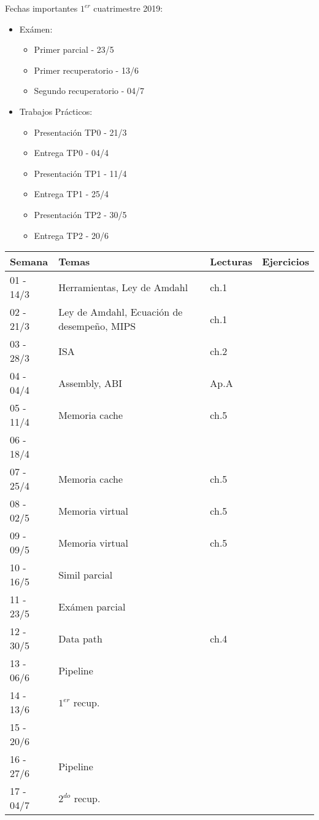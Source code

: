 \documentclass[9pt,a4paper]{article}
\begin{document}
Fechas importantes $1^{er}$ cuatrimestre 2019:

\begin{itemize}
\item Exámen:
\begin{itemize}
\item Primer parcial - 23/5
\item Primer recuperatorio - 13/6
\item Segundo recuperatorio - 04/7
\end{itemize}
\item Trabajos Prácticos:
\begin{itemize}
\item Presentación TP0 - 21/3
\item Entrega TP0 - 04/4
\item Presentación TP1 - 11/4
\item Entrega TP1 - 25/4
\item Presentación TP2 - 30/5
\item Entrega TP2 - 20/6
\end{itemize}

\end{itemize}

\begin{tabular}{ |l | l | l | l |}
\hline
Semana & Temas			& Lecturas     & Ejercicios						\\
\hline
01 - 14/3	& Herramientas, Ley de Amdahl 		& ch.1 \cite{caaqa}	&			\\
\hline
02 - 21/3	& Ley de Amdahl, Ecuación de desempeño, MIPS & ch.1 \cite{caaqa}    &	\\
\hline
03 - 28/3	& ISA					&		ch.2 \cite{caaqa}	&					\\
\hline
04 - 04/4	& Assembly, ABI 	& 		Ap.A \cite{caaqa} \cite{abi} &	\\
\hline
05 - 11/4	& Memoria cache	& 	ch.5 \cite{caaqa}	&	\\
\hline
\rowcolor{lightgray} 06 - 18/4	& 	& 		&		\\
\hline
07 - 25/4	& Memoria cache	& 		ch.5 \cite{caaqa} &	\\
\hline
08 - 02/5	& Memoria virtual	&	ch.5 \cite{caaqa} &						\\
\hline
09 - 09/5	& Memoria virtual	& 	ch.5 \cite{caaqa} \cite{vmp1} \cite{vmp2} &	\\
\hline
10 - 16/5	& Simil parcial	&		&							\\
\hline
\rowcolor{green} 11 - 23/5	& Exámen parcial	& 	&								\\
\hline
12 - 30/5	& Data path			& 	ch.4 \cite{coadhsi} & \\
\hline
13 - 06/6 & Pipeline			& 	&	\\
\hline
\rowcolor{green} 14 - 13/6 & $1^{er}$ recup.	&		&							\\
\hline
\rowcolor{lightgray} 15 - 20/6	& 			&	&								\\
\hline
16 - 27/6 & Pipeline 	&					& \\
\hline
\rowcolor{green} 17 - 04/7 & $2^{do}$ recup.			&		& \\
\hline

\end{tabular}
\end{document}
